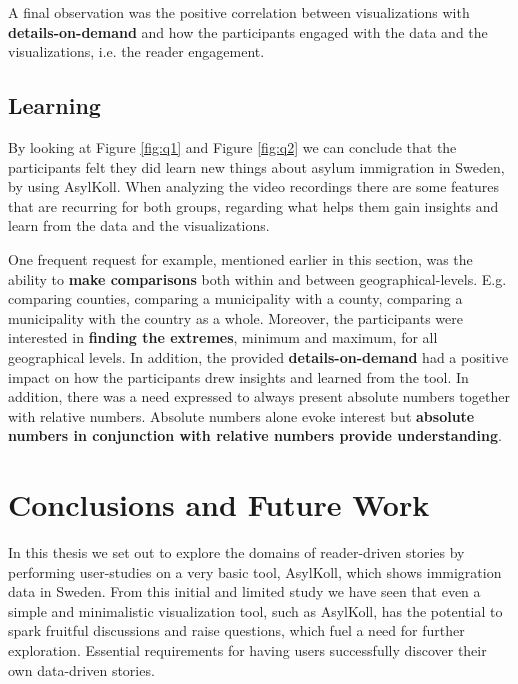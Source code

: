 \documentclass{acmtog} %
\begin{document}
A final observation was the positive correlation between visualizations with \textbf{details-on-demand} and how the participants engaged with the data and the visualizations, i.e. the reader engagement.

\subsection{Learning}
\label{sub:disc_le}
By looking at Figure \ref{fig:q1} and Figure \ref{fig:q2} we can conclude that the participants felt they did learn new things about asylum immigration in Sweden, by using AsylKoll. When analyzing the video recordings there are some features that are recurring for both groups, regarding what helps them gain insights and learn from the data and the visualizations.

One frequent request for example, mentioned earlier in this section, was the ability to \textbf{make comparisons} both within and between geographical-levels. E.g. comparing counties, comparing a municipality with a county, comparing a municipality with the country as a whole. Moreover, the participants were interested in \textbf{finding the extremes}, minimum and maximum, for all geographical levels. In addition, the provided \textbf{details-on-demand} had a positive impact on how the participants drew insights and learned from the tool. In addition, there was a need expressed to always present absolute numbers together with relative numbers. Absolute numbers alone evoke interest but \textbf{absolute numbers in conjunction with relative numbers provide understanding}.

\section{Conclusions and Future Work}
\label{sec:conclusion} 
In this thesis we set out to explore the domains of reader-driven stories by performing user-studies on a very basic tool, AsylKoll, which shows immigration data in Sweden. From this initial and limited study we have seen that even a simple and minimalistic visualization tool, such as AsylKoll, has the potential to spark fruitful discussions and raise questions, which fuel a need for further exploration. Essential requirements for having users successfully discover their own data-driven stories.
\end{document}
